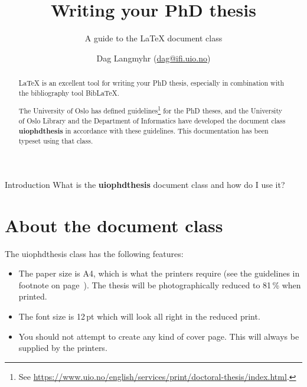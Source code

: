 \documentclass[UKenglish]{uiophdthesis}
\title{Writing your PhD thesis}
\subtitle{A guide to the \LaTeX{} document class \pb{uiophdthesis}}
\author{Dag Langmyhr (\url{dag@ifi.uio.no})}
\newcommand{\p}[1]{\textsf{#1}}
\newcommand{\pb}[1]{\textbf{\p{#1}}}
\begin{document}
\uiomasterfp[kind=Documentation, compact, nosp, colour=grey,
  date=\today]

\frontmatter
\maketitle

\begin{abstract}
\LaTeX{} is an excellent tool for writing your PhD thesis, especially in
combination with the bibliography tool Bib\LaTeX.

The University of Oslo has defined guidelines\footnote{\label{guidelines}See
  \url{https://www.uio.no/english/services/print/doctoral-thesis/index.html}.}
for the PhD theses, and 
the University of Oslo Library and the Department of Informatics have
developed the document class \pb{uiophdthesis} in accordance with these
guidelines. This documentation has been typeset using that class.
\end{abstract}

\tableofcontents

\mainmatter
\begin{uioseparatorpage}{Introduction\label{intro-part}}
  What is the \pb{uiophdthesis} document class and how do I use it?
\end{uioseparatorpage}

\chapter{About the document class}
The \p{uiophdthesis} class has the following features:
\begin{itemize}
\item The paper size is A4, which is what the printers require (see
  the guidelines in footnote on page~\pageref{guidelines}).
  The thesis will be photographically reduced to
  81\,\% when printed.

\item The font size is 12\,pt which will look all right in the reduced
  print.

\item You should not attempt to create any kind of cover page. This
  will always be supplied by the printers.
\end{itemize}
\end{document}
